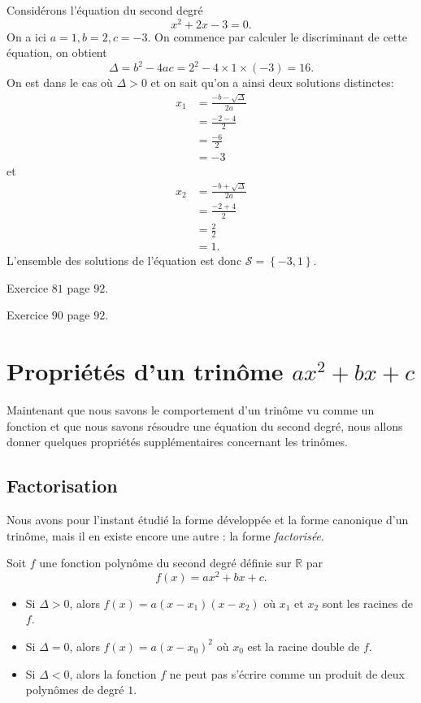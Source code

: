 \documentclass[11pt]{article}
\begin{document}
\begin{exemple}
  Considérons l'équation du second degré
  \[
    x^2+2x-3 = 0.
  \]
  On a ici $a=1, b=2, c=-3$. On commence par calculer le discriminant de cette
  équation, on obtient
  \[
    \Delta = b^2-4ac = 2^2 - 4\times1\times(-3)=16.
  \]
  On est dans le cas où $\Delta>0$ et on sait qu'on a ainsi deux solutions
  distinctes:
  \begin{align*}
    x_1 &= \frac{-b-\sqrt\Delta}{2a} \\
    &= \frac{-2-4}{2}\\
    &= \frac{-6}{2}\\
    &= -3
  \end{align*}
  et
  \begin{align*}
    x_2 &= \frac{-b+\sqrt\Delta}{2a} \\
    &= \frac{-2+4}{2}\\
    &= \frac{2}{2}\\
    &= 1.
  \end{align*}
  L'ensemble des solutions de l'équation est donc $\mathscr S = \left\{ -3, 1
  \right\}$.
\end{exemple}

\begin{exo}
  Exercice $81$ page $92$.
\end{exo}
\begin{exo}
  Exercice $90$ page $92$.
\end{exo}

\section{Propriétés d'un trinôme $ax^2+bx+c$}

Maintenant que nous savons le comportement d'un trinôme vu comme un fonction et
que nous savons résoudre une équation du second degré, nous allons donner
quelques propriétés supplémentaires concernant les trinômes.

\subsection{Factorisation}

Nous avons pour
l'instant étudié la forme développée et la forme canonique d'un trinôme, mais il
en existe encore une autre : la forme \emph{factorisée}.

\begin{prop}
  Soit $f$ une fonction polynôme du second degré définie sur $\mathbb{R}$ par
  \[
    f(x) = ax^2+bx+c.
  \]
  \begin{itemize}
    \item Si $\Delta>0$, alors $f(x)=a(x-x_1)(x-x_2)$ où $x_1$ et $x_2$ sont les
      racines de $f$.
    \item Si $\Delta=0$, alors $f(x)=a(x-x_0)^2$ où $x_0$ est la racine double de
      $f$.
    \item Si $\Delta<0$, alors la fonction $f$ ne peut pas s'écrire comme un
      produit de deux polynômes de degré $1$.
  \end{itemize}
\end{prop}
\end{document}
